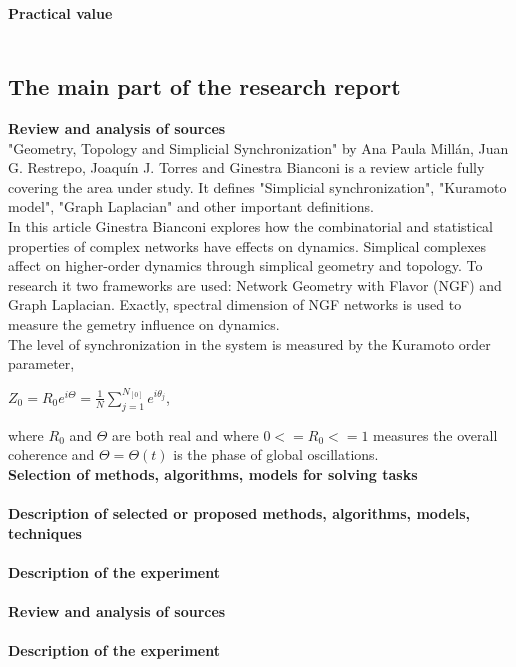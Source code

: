 \documentclass[draft]{article}
\newcommand\tab[1][1cm]{\hspace*{#1}}
\begin{document}
~\\
\textbf{Practical value}\\
~\\
\newpage
\begin{center}
\section {The main part of the research report}
\end{center}
\textbf{Review and analysis of sources}\\
\tab "Geometry, Topology and Simplicial Synchronization"\cite{litlink3} by Ana Paula Millán, Juan G. Restrepo, Joaquín J. Torres and Ginestra Bianconi is a review article fully covering the area under study. It defines "Simplicial synchronization", "Kuramoto model", "Graph Laplacian" and other important definitions. \\
\tab In this article Ginestra Bianconi explores how the combinatorial and statistical properties of complex networks have effects on dynamics. Simplical complexes affect on higher-order dynamics through simplical geometry and topology. To research it two frameworks are used: Network Geometry with Flavor (NGF) and Graph Laplacian. Exactly, spectral dimension of NGF networks is used to measure the gemetry influence on dynamics.\\
\tab The level of synchronization in the system is measured by the
Kuramoto order parameter,
\begin{center}
$Z_0 = R_0e^{i\Theta} = \frac{1}{N} \sum_{j=1}^{N_[0]}e^{i\theta _j}$,
\end{center}
where $R_0$ and $\Theta$ are both real and where $0<=R_0<=1$ measures the overall coherence and $\Theta = \Theta (t)$ is the phase of global oscillations.
~\\
\textbf{Selection of methods, algorithms, models for solving tasks}\\
~\\
\textbf{Description of selected or proposed methods, algorithms, models, techniques}\\
~\\
\textbf{Description of the experiment}\\
~\\
\textbf{Review and analysis of sources}\\
~\\
\textbf{Description of the experiment}\\
~\\
\end{document}
